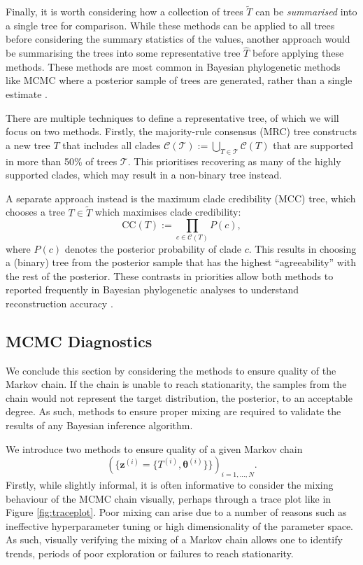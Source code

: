 Finally, it is worth considering how a collection of trees $\tilde{T}$ can be \textit{summarised} into a single tree for comparison. While these methods can be applied to all trees before considering the summary statistics of the values, another approach would be summarising the trees into some representative tree $\hat{T}$ before applying these methods. These methods are most common in Bayesian phylogenetic methods like MCMC where a posterior sample of trees are generated, rather than a single estimate \cite{OReilly2018, Tahiri2022, hoffmann_bayesian_2021}.

There are multiple techniques to define a representative tree, of which we will focus on two methods. Firstly, the majority-rule consensus (MRC) tree constructs a new tree $T$ that includes all clades $\mathcal{C}(
\mathcal{T}) := \bigcup_{T \in \mathcal{T}} \mathcal{C}(T)$ that are supported in more than 50\% of trees $\mathcal{T}$. This prioritises recovering as many of the highly supported clades, which may result in a non-binary tree instead. 

A separate approach instead is the maximum clade credibility (MCC) tree, which chooses a tree $T \in \tilde{T}$ which maximises clade credibility:
\begin{equation}
    \text{CC}(T) := \prod_{c \in \mathcal{C}(T)} P(c),
\end{equation}
where $P(c)$ denotes the posterior probability of clade $c$. This results in choosing a (binary) tree from the posterior sample that has the highest ``agreeability'' with the rest of the posterior. These contrasts in priorities allow both methods to reported frequently in Bayesian phylogenetic analyses to understand reconstruction accuracy \cite{OReilly2018}.

\subsection{MCMC Diagnostics}
\label{sec:mcmcdiagnostics}

We conclude this section by considering the methods to ensure quality of the Markov chain. If the chain is unable to reach stationarity, the samples from the chain would not represent the target distribution, the posterior, to an acceptable degree. As such, methods to ensure proper mixing are required to validate the results of any Bayesian inference algorithm.

We introduce two methods to ensure quality of a given Markov chain 
\begin{equation}
\left(\{\mathbf{z}^{(i)} = \{T^{(i)}, \boldsymbol{\theta}^{(i)}\}\}\right)_{i = 1, ..., N}.
\end{equation} 
Firstly, while slightly informal, it is often informative to consider the mixing behaviour of the MCMC chain visually, perhaps through a trace plot like in Figure \ref{fig:traceplot}. Poor mixing can arise due to a number of reasons such as ineffective hyperparameter tuning or high dimensionality of the parameter space. As such, visually verifying the mixing of a Markov chain allows one to identify trends, periods of poor exploration or failures to reach stationarity. 

